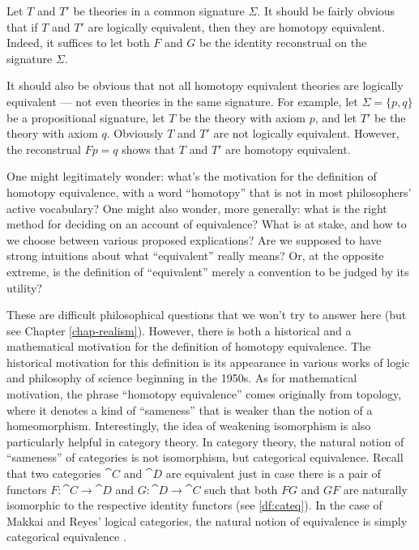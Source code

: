 \begin{disc} Let $T$ and $T'$ be theories in a common signature
  $\Sigma$.  It should be fairly obvious that if $T$ and $T'$ are
  logically equivalent, then they are homotopy equivalent.  Indeed, it
  suffices to let both $F$ and $G$ be the identity reconstrual on the
  signature $\Sigma$.

  It should also be obvious that not all homotopy equivalent theories
  are logically equivalent --- not even theories in the same
  signature.  For example, let $\Sigma =\{ p,q\}$ be a propositional
  signature, let $T$ be the theory with axiom $p$, and let $T'$ be the
  theory with axiom $q$.  Obviously $T$ and $T'$ are not logically
  equivalent.  However, the reconstrual $Fp=q$ shows that $T$ and $T'$
  are homotopy equivalent. \end{disc}

\begin{disc} One might legitimately wonder: what's the motivation for
  the definition of homotopy equivalence, with a word ``homotopy''
  that is not in most philosophers' active vocabulary?  One might also
  wonder, more generally: what is the right method for deciding on an
  account of equivalence?  What is at stake, and how to we choose
  between various proposed explications?  Are we supposed to have
  strong intuitions about what ``equivalent'' really means?  Or, at
  the opposite extreme, is the definition of ``equivalent'' merely a
  convention to be judged by its utility?

  These are difficult philosophical questions that we won't try to
  answer here (but see Chapter \ref{chap-realism}).  However, there is
  both a historical and a mathematical motivation for the definition
  of homotopy equivalence.  The historical motivation for this
  definition is its appearance in various works of logic and
  philosophy of science beginning in the 1950s.  As for mathematical
  motivation, the phrase ``homotopy equivalence'' comes originally
  from topology, where it denotes a kind of ``sameness'' that is
  weaker than the notion of a homeomorphism.  Interestingly, the idea
  of weakening isomorphism is also particularly helpful in category
  theory.  In category theory, the natural notion of ``sameness'' of
  categories is not isomorphism, but categorical equivalence.  Recall
  that two categories $\cat{C}$ and $\cat{D}$ are equivalent just in
  case there is a pair of functors $F:\cat{C}\to\cat{D}$ and
  $G:\cat{D}\to\cat{C}$ such that both $FG$ and $GF$ are naturally
  isomorphic to the respective identity functors (see \ref{df:cateq}).
  In the case of Makkai and Reyes' logical categories, the natural
  notion of equivalence is simply categorical equivalence
  \cite[see][]{makkai}.
\end{disc}

